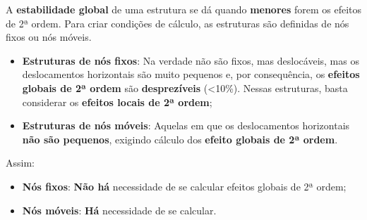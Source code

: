 A \textbf{estabilidade global} de uma estrutura se dá quando \textbf{menores} forem os efeitos de 2ª ordem. Para criar condições de cálculo, as estruturas são definidas de nós fixos ou nós móveis.

\begin{itemize}
	\item \textbf{Estruturas de nós fixos}: Na verdade não são fixos, mas deslocáveis, mas os deslocamentos horizontais são muito pequenos e, por consequência, os \textbf{efeitos globais de 2ª ordem} são \textbf{desprezíveis} (<10\%). Nessas estruturas, basta considerar os \textbf{efeitos locais de 2ª ordem};

	\item \textbf{Estruturas de nós móveis}: Aquelas em que os deslocamentos horizontais \textbf{não são pequenos}, exigindo cálculo dos \textbf{efeito globais de 2ª ordem}.
\end{itemize}

Assim:

\begin{itemize}
	\item \textbf{Nós fixos}: \textbf{Não há} necessidade de se calcular efeitos globais de 2ª ordem;
	\item \textbf{Nós móveis}: \textbf{Há} necessidade de se calcular.
\end{itemize}